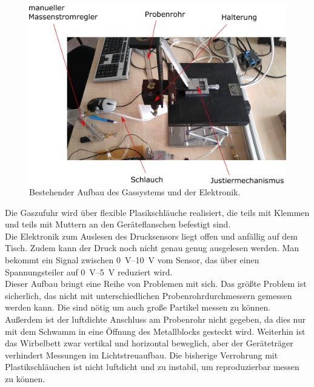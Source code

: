 \begin{figure}[h!]
	\begin{center}
		\includegraphics[scale=0.3]{Altes_Wirbelbett_oben.png}
		\caption[Bestehender Aufbau des Gassystems und der Elektronik]{Bestehender Aufbau des Gassystems und der Elektronik.}
	\end{center}
\end{figure}	


Die Gaszufuhr wird über flexible Plasikschläuche realisiert, die teils mit Klemmen und teils mit Muttern an den Geräteflanschen befestigt sind. \\
Die Elektronik zum Auslesen des Drucksensors liegt offen und anfällig auf dem Tisch. Zudem kann der Druck noch nicht genau genug ausgelesen werden. Man bekommt ein Signal zwischen \SIrange{0}{10}{\volt} vom Sensor, das über einen Spannungsteiler auf \SIrange{0}{5}{\volt} reduziert wird. \\
Dieser Aufbau bringt eine Reihe von Problemen mit sich. Das größte Problem ist sicherlich, das nicht mit unterschiedlichen Probenrohrdurchmessern gemessen werden kann. Die sind nötig um auch große Partikel messen zu können. Außerdem ist der luftdichte Anschluss am Probenrohr nicht gegeben, da dies nur mit dem Schwamm in eine Öffnung des Metallblocks gesteckt wird.
Weiterhin ist das Wirbelbett zwar vertikal und horizontal beweglich, aber der Geräteträger verhindert Messungen im Lichtstreuaufbau.
Die bisherige Verrohrung mit Plastikschläuchen ist nicht luftdicht und zu instabil, um reproduzierbar messen zu können. \\



